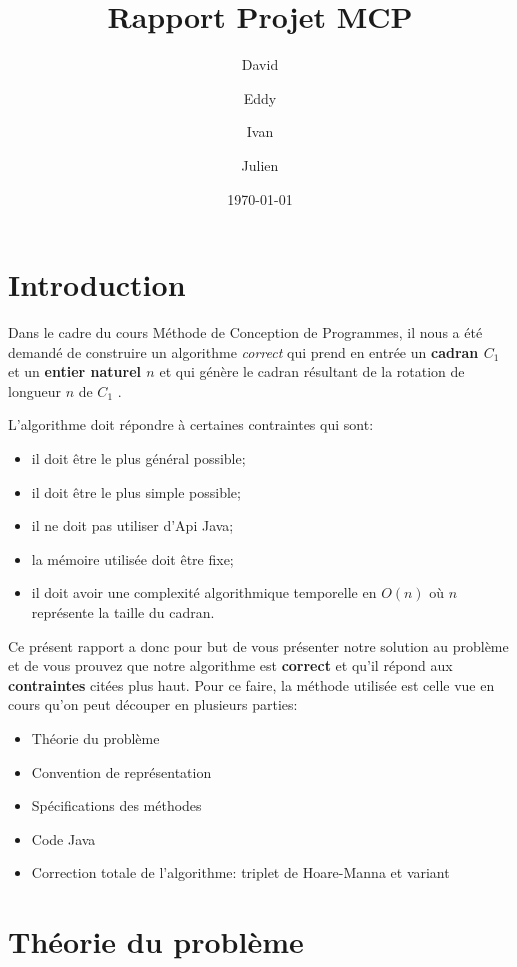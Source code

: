 \documentclass[a4paper, 12pt]{report}
\author{David \bsc{Haven} \and Eddy \bsc{Ndizera} \and Ivan \bsc{Ahad} \and Julien \bsc{Sterbelle}}
\title{Rapport Projet MCP}
\date{\today}
\begin{document}
\maketitle

\section*{Introduction}

Dans le cadre du cours Méthode de Conception de Programmes, il nous a été demandé de construire un algorithme \textit{correct} qui prend en entrée un \textbf{cadran $C_{1}$} et un \textbf{entier naturel $n$} et qui génère le cadran résultant de la rotation de longueur $n$ de $C_{1}$ . \newline

L'algorithme doit répondre à certaines contraintes qui sont:
\begin{itemize}
\item il doit être le plus général possible;
\item il doit être le plus simple possible;
\item il ne doit pas utiliser d'Api Java;
\item la mémoire utilisée doit être fixe;
\item il doit avoir une complexité algorithmique temporelle en $O(n)$ où $n$ représente la taille du cadran. \newline
\end{itemize}

Ce présent rapport a donc pour but de vous présenter notre solution au problème et de vous prouvez que notre algorithme est \textbf{correct} et qu'il répond aux \textbf{contraintes} citées plus haut. Pour ce faire, la méthode utilisée est celle vue en cours qu'on peut découper en plusieurs parties:
\begin{itemize}
\item Théorie du problème
\item Convention de représentation
\item Spécifications des méthodes
\item Code Java
\item Correction totale de l'algorithme: triplet de Hoare-Manna et variant \newline
\end{itemize}

\section{Théorie du problème}
\end{document}
